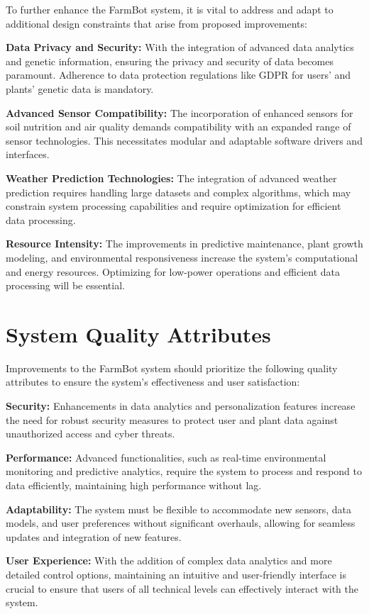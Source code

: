 To further enhance the FarmBot system, it is vital to address and adapt to additional design constraints that arise from proposed improvements:

\textbf{Data Privacy and Security:} With the integration of advanced data analytics and genetic information, ensuring the privacy and security of data becomes paramount. Adherence to data protection regulations like GDPR for users' and plants' genetic data is mandatory.

\textbf{Advanced Sensor Compatibility:} The incorporation of enhanced sensors for soil nutrition and air quality demands compatibility with an expanded range of sensor technologies. This necessitates modular and adaptable software drivers and interfaces.

\textbf{Weather Prediction Technologies:} The integration of advanced weather prediction requires handling large datasets and complex algorithms, which may constrain system processing capabilities and require optimization for efficient data processing.

\textbf{Resource Intensity:} The improvements in predictive maintenance, plant growth modeling, and environmental responsiveness increase the system's computational and energy resources. Optimizing for low-power operations and efficient data processing will be essential.

\section{System Quality Attributes}

Improvements to the FarmBot system should prioritize the following quality attributes to ensure the system's effectiveness and user satisfaction:

\textbf{Security:} Enhancements in data analytics and personalization features increase the need for robust security measures to protect user and plant data against unauthorized access and cyber threats.

\textbf{Performance:} Advanced functionalities, such as real-time environmental monitoring and predictive analytics, require the system to process and respond to data efficiently, maintaining high performance without lag.

\textbf{Adaptability:} The system must be flexible to accommodate new sensors, data models, and user preferences without significant overhauls, allowing for seamless updates and integration of new features.

\textbf{User Experience:} With the addition of complex data analytics and more detailed control options, maintaining an intuitive and user-friendly interface is crucial to ensure that users of all technical levels can effectively interact with the system.

